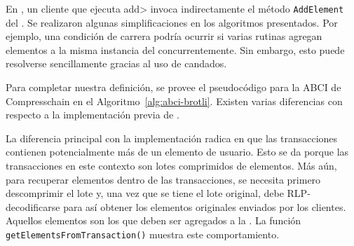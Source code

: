 



%
En \compresschain, un cliente que ejecuta \<add> invoca indirectamente el método \texttt{AddElement}
del \collector.
%
Se realizaron algunas simplificaciones en los algoritmos presentados. Por ejemplo, una condición de carrera
podría ocurrir si varias rutinas agregan elementos a la misma instancia del \collector concurrentemente.
Sin embargo, esto puede resolverse sencillamente gracias al uso de candados.



%
Para completar nuestra definición, se provee el pseudocódigo para la ABCI de Compresschain en el
Algoritmo~\ref{alg:abci-brotli}.
%
Existen varias diferencias con respecto a la implementación previa de \setchain.
%


La diferencia principal con la implementación \vanilla radica en que las transacciones contienen
potencialmente más de un elemento de usuario. Esto se da porque las transacciones en este contexto
son lotes comprimidos de elementos.
%
Más aún, para recuperar elementos dentro de las transacciones, se necesita primero descomprimir
el lote y, una vez que se tiene el lote original, debe RLP-decodificarse para así obtener los elementos
originales enviados por los clientes.
%
Aquellos elementos son los que deben ser agregados a la \setchain. La función \texttt{getElementsFromTransaction()}
muestra este comportamiento.

